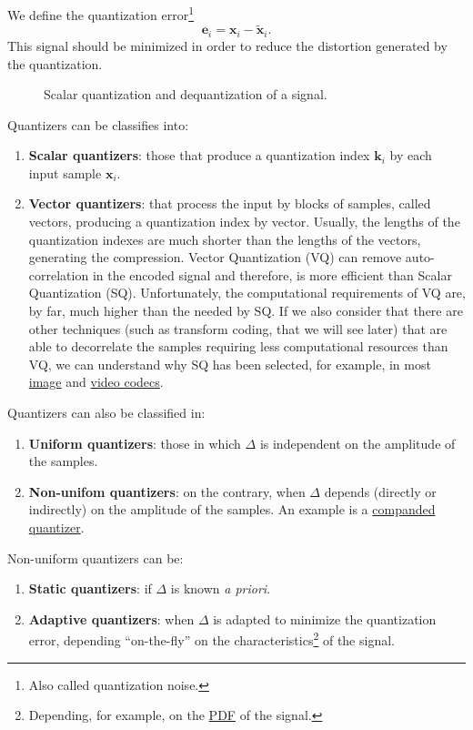 We define the quantization error\footnote{Also called quantization
noise.}
\begin{equation}
  {\mathbf e}_i = {\mathbf x}_i - \tilde{{\mathbf x}}_i.
\end{equation}
This signal should be minimized in order to reduce the distortion
generated by the quantization.

\begin{figure}
  \centering
  \caption{Scalar quantization and dequantization of a signal.}
  \label{fig:Q}
\end{figure}

Quantizers can be classifies into:
\begin{enumerate}
\item \textbf{Scalar quantizers}: those that produce a quantization
  index ${\mathbf k}_i$ by each input sample ${\mathbf x}_i$.
\item \textbf{Vector quantizers}: that process the input by blocks of
  samples, called vectors, producing a quantization index by vector.
  Usually, the lengths of the quantization indexes are much shorter than
  the lengths of the vectors, generating the compression. Vector
  Quantization (VQ) can remove auto-correlation in the encoded signal
  and therefore, is more efficient than Scalar Quantization
  (SQ). Unfortunately, the computational requirements of VQ are, by
  far, much higher than the needed by SQ. If we also consider that
  there are other techniques (such as transform coding, that we will
  see later) that are able to decorrelate the samples requiring less
  computational resources than VQ, we can understand why SQ has been
  selected, for example, in
  most \href{https://en.wikipedia.org/wiki/Image_compression}{image}
  and \href{https://en.wikipedia.org/wiki/Video_coding_format}{video
  codecs}.
\end{enumerate}

Quantizers can also be classified in:
\begin{enumerate}
\item \textbf{Uniform quantizers}: those in which $\Delta$ is
  independent on the amplitude of the samples.
\item \textbf{Non-unifom quantizers}: on the contrary, when $\Delta$
  depends (directly or indirectly) on the amplitude of the samples. An
  example is a
  \href{https://en.wikipedia.org/wiki/Companding}{companded
    quantizer}.
\end{enumerate}

Non-uniform quantizers can be:
\begin{enumerate}
\item \textbf{Static quantizers}: if $\Delta$ is known \emph{a
priori}.
\item \textbf{Adaptive quantizers}: when $\Delta$ is adapted to
  minimize the quantization error, depending ``on-the-fly'' on the
  characteristics\footnote{Depending, for example, on the
    \href{https://en.wikipedia.org/wiki/Probability_density_function}{PDF}
    of the signal.} of the signal.
\end{enumerate}

